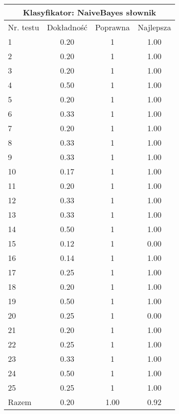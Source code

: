 \documentclass[notitlepage,leqno,fleqn,a4paper]{article}
\begin{document}
\begin{tabular}{|l|c|c|c|}
\hline
\multicolumn{4}{|c|}{Klasyfikator: NaiveBayes słownik}\\
\hline
Nr. testu & Dokładność & Poprawna & Najlepsza\\
\hline
1 & 0.20 & 1 & 1.00 \\
2 & 0.20 & 1 & 1.00 \\
3 & 0.20 & 1 & 1.00 \\
4 & 0.50 & 1 & 1.00 \\
5 & 0.20 & 1 & 1.00 \\
6 & 0.33 & 1 & 1.00 \\
7 & 0.20 & 1 & 1.00 \\
8 & 0.33 & 1 & 1.00 \\
9 & 0.33 & 1 & 1.00 \\
10 & 0.17 & 1 & 1.00 \\
11 & 0.20 & 1 & 1.00 \\
12 & 0.33 & 1 & 1.00 \\
13 & 0.33 & 1 & 1.00 \\
14 & 0.50 & 1 & 1.00 \\
15 & 0.12 & 1 & 0.00 \\
16 & 0.14 & 1 & 1.00 \\
17 & 0.25 & 1 & 1.00 \\
18 & 0.20 & 1 & 1.00 \\
19 & 0.50 & 1 & 1.00 \\
20 & 0.25 & 1 & 0.00 \\
21 & 0.20 & 1 & 1.00 \\
22 & 0.25 & 1 & 1.00 \\
23 & 0.33 & 1 & 1.00 \\
24 & 0.50 & 1 & 1.00 \\
25 & 0.25 & 1 & 1.00 \\
\hline
Razem & 0.20 & 1.00 & 0.92 \\
\hline
\end{tabular}
\end{document}
